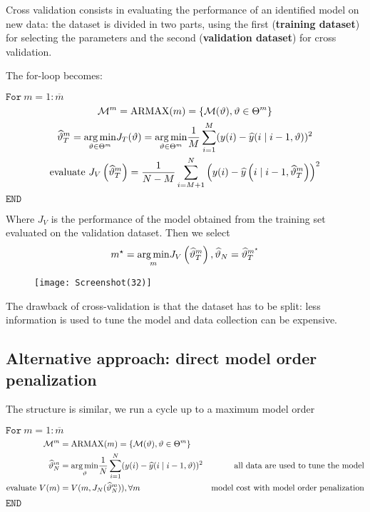 Cross validation consists in evaluating the performance of an identified model on new data: the dataset is divided in two parts, using the first (\textbf{training dataset}) for selecting the parameters and the second (\textbf{validation dataset}) for cross validation.

The for-loop becomes:

$ \mathtt{For } \ m=1:\overline{m}$
\begin{gather*}
\mathcal{M}^{m} =\text{ARMAX}(m) =\left\{\mathcal{M}(\vartheta) ,\vartheta \in \Theta ^{m}\right\}\\
\widehat{\vartheta }_{T}^{m} =\underset{\vartheta \in \Theta ^{m}}{\operatorname*{arg\,min}} J_{T}(\vartheta) =\underset{\vartheta \in \Theta ^{m}}{\operatorname*{arg\,min}}\frac{1}{M}\sum _{i=1}^{M}(y(i) -\widehat{y}(i\mid i-1,\vartheta))^{2}\\
\text{evaluate } J_{V}\left(\widehat{\vartheta }_{T}^{m}\right) =\frac{1}{N-M}\sum _{i=M+1}^{N}\left(y(i) -\widehat{y}\left(i\mid i-1,\widehat{\vartheta }_{T}^{m}\right)\right)^{2}
\end{gather*}
$ \mathtt{END}$

Where $ J_{V}$ is the performance of the model obtained from the training set evaluated on the validation dataset. Then we select
\begin{equation*}
m^{\star} =\underset{m}{\operatorname*{arg\,min}} J_{V}\left(\widehat{\vartheta }_{T}^{m}\right) ,\widehat{\vartheta }_{N} =\widehat{\vartheta }_{T}^{m^{\star}}
\end{equation*}

\begin{figure}[htpb]
    \centering
    \texttt{[image: Screenshot(32)]}
\end{figure}
\FloatBarrier
The drawback of cross-validation is that the dataset has to be split: less information is used to tune the model and data collection can be expensive.


\subsection{Alternative approach: direct model order penalization}
The structure is similar, we run a cycle up to a maximum model order

$ \mathtt{For } \ m=1:\overline{m}$
\begin{equation*}
\begin{aligned}
\mathcal{M}^{m} & =\text{ARMAX}(m) =\left\{\mathcal{M}(\vartheta) ,\vartheta \in \Theta ^{m}\right\} & \\
\widehat{\vartheta }_{N}^{m}  & =\underset{\vartheta }{\operatorname*{arg\,min}}\frac{1}{N}\sum _{i=1}^{N}(y(i) -\widehat{y}(i\mid i-1,\vartheta))^{2} & \text{all data are used to tune the model}\\
\text{evaluate } V(m) & =V(m,J_{N}(\widehat{\vartheta }_{N}^{m})),\forall m & \text{model cost with model order penalization}
\end{aligned}
\end{equation*}
$ \mathtt{END}$

